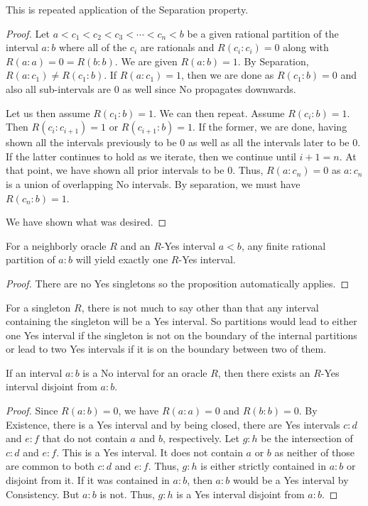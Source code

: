 \documentclass[12pt]{article}
\begin{document}
This is repeated application of the Separation property. 

\begin{proof}
Let $a < c_1 < c_2 < c_3 < \cdots < c_n < b$ be a given rational partition of the interval $a:b$ where all of the $c_i$ are rationals and $R(c_i:c_i) = 0$ along with $R(a:a) = 0 = R(b:b)$. We are given $R(a:b) = 1$. By Separation, $R(a:c_1) \neq R(c_1:b)$. If $R(a:c_1)=1$, then we are done as $R(c_1:b)=0$ and also all sub-intervals are 0 as well since No propagates downwards. 

Let us then assume $R(c_1:b)=1$. We can then repeat. Assume $R(c_i:b)=1$. Then $R(c_i:c_{i+1})=1$ or $R(c_{i+1}:b)=1$. If the former, we are done, having shown all the intervals previously to be 0 as well as all the intervals later to be 0.  If the latter continues to hold as we iterate, then we continue until $i+1 = n$. At that point, we have shown all prior intervals to be 0. Thus, $R(a:c_n)=0$ as $a:c_{n}$ is a union of overlapping No intervals. By separation, we must have $R(c_n:b) = 1$. 

We have shown what was desired. 
\end{proof}

\begin{corollary}
    For a neighborly oracle $R$ and an $R$-Yes interval $a\lt b$, any finite rational partition of $a:b$ will yield exactly one $R$-Yes interval. 
\end{corollary}

\begin{proof}
    There are no Yes singletons so the proposition automatically applies. 
\end{proof}

For a singleton $R$, there is not much to say other than that any interval containing the singleton will be a Yes interval. So partitions would lead to either one Yes interval if the singleton is not on the boundary of the internal partitions or lead to two Yes intervals if it is on the boundary between two of them. 

\begin{proposition}\label{pr:no-is-disjoint}
    If an interval $a:b$ is a No interval for an oracle $R$, then there exists an $R$-Yes interval disjoint from $a:b$.
\end{proposition}

\begin{proof}
    Since $R(a:b) = 0$, we have $R(a:a) = 0$ and $R(b:b) = 0$. By Existence, there is a Yes interval and by being closed, there are Yes intervals $c:d$ and $e:f$ that do not contain $a$ and $b$, respectively. Let $g:h$ be the intersection of $c:d$ and $e:f$. This is a Yes interval. It does not contain $a$ or $b$ as neither of those are common to both $c:d$ and $e:f$. Thus, $g:h$ is either strictly contained in $a:b$ or disjoint from it. If it was contained in $a:b$, then $a:b$ would be a Yes interval by Consistency. But $a:b$ is not. Thus, $g:h$ is a Yes interval disjoint from $a:b$.
\end{proof}
\end{document}
